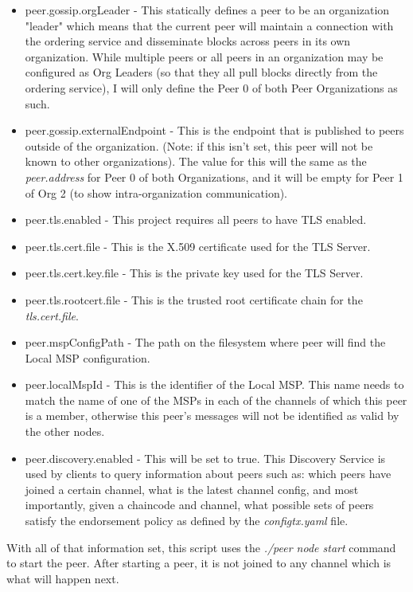 \begin{itemize}
\begin{itemize}
							\item peer.gossip.orgLeader - This statically defines a peer to be an organization "leader" which means that the current peer will maintain a connection with the ordering service and disseminate blocks across peers in its own organization. While multiple peers or all peers in an organization may be configured as Org Leaders (so that they all pull blocks directly from the ordering service), I will only define the Peer 0 of both Peer Organizations as such.
							\item peer.gossip.externalEndpoint - This is the endpoint that is published to peers outside of the organization. (Note: if this isn't set, this peer will not be known to other organizations). The value for this will the same as the \textit{peer.address} for Peer 0 of both Organizations, and it will be empty for Peer 1 of Org 2 (to show intra-organization communication).
							\item peer.tls.enabled - This project requires all peers to have TLS enabled.
							\item peer.tls.cert.file - This is the X.509 certificate used for the TLS Server.
							\item peer.tls.cert.key.file - This is the private key used for the TLS Server.
							\item peer.tls.rootcert.file - This is the trusted root certificate chain for the \textit{tls.cert.file}.
							\item peer.mspConfigPath - The path on the filesystem where peer will find the Local MSP configuration.
							\item peer.localMspId - This is the identifier of the Local MSP. This name needs to match the name of one of the MSPs in each of the channels of which this peer is a member, otherwise this peer's messages will not be identified as valid by the other nodes.
							\item peer.discovery.enabled - This will be set to true. This Discovery Service is used by clients to query information about peers such as: which peers have joined a certain channel, what is the latest channel config, and most importantly, given a chaincode and channel, what possible sets of peers satisfy the endorsement policy as defined by the \textit{configtx.yaml} file.
						\end{itemize}
						
					\hspace{10mm}With all of that information set, this script uses the \textit{./peer node start} command to start the peer. After starting a peer, it is not joined to any channel which is what will happen next.
					

\end{itemize}
